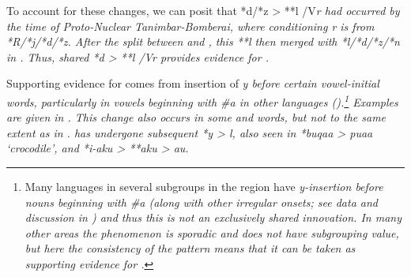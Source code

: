 To account for these changes,
we can posit that *d/*z > **l /{\gap}V\it{r} had occurred by
the time of Proto-Nuclear Tanimbar-Bomberai,
where conditioning \it{r} is from *R/*j/*d/*z.
After the split between 
and , this **l then merged with *l/*d/*z/*n in .
Thus, shared *d > **l /{\gap}V\it{r} provides evidence for .

Supporting evidence for  comes
from insertion of \it{y} before certain vowel-initial words,
particularly in vowels beginning with \it{{\#}a} in other languages ().\footnote{
		Many languages in several subgroups in the region have \it{y}-insertion
		before nouns beginning with \it{{\#}a} (along with other irregular
		onsets; see data and discussion in )
		and thus this is not an exclusively shared innovation.
		In many other areas the phenomenon is sporadic
		and does not have subgrouping value,
		but here the consistency of the pattern means that it can be
		taken as supporting evidence for .}
Examples are given in .
This change also occurs in some 
and  words,
but not to the same extent as in .
 has undergone subsequent *y > \it{l},
also seen in *buqaa > \it{puaa} ‘crocodile’,
and *i-aku > **aku > \it{au}.


